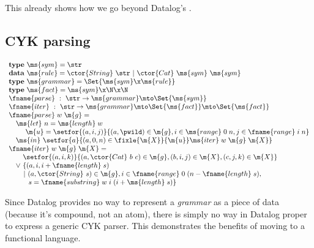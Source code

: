 \documentclass[preprint]{sigplanconf}
\newcommand{\uto}{\to}
\begin{document}
\TODO This already shows how we go beyond Datalog's .

\subsection{CYK parsing}

\[\begin{array}{l}
\mathbf{type}~\ms{sym} = \str\\
\mathbf{data}~\ms{rule} = \ctor{String}~\str ~|~ \ctor{Cat}~\ms{sym}~\ms{sym}\\
\mathbf{type}~\ms{grammar} = \Set{\ms{sym} \x \ms{rule}}\\
\mathbf{type}~\ms{fact} = \ms{sym} \x \N \x \N\\
\fname{parse} ~:~ \str \uto \ms{grammar} \mto \Set{\ms{sym}}\\
\fname{iter} ~:~ \str \uto \ms{grammar} \mto \Set{\ms{fact}}
\mto \Set{\ms{fact}}\\
\fname{parse}\;w\;\m{g} =\\
\hspace{1em} \ms{let}~ n = \ms{length}\;w\\
\hspace{2.375em}\m{u} =
  \setfor{(a,i,j)}{(a,\pwild) \in \m{g}, i \in \ms{range}\;0\;n,
  j\in\fname{range}\;i\;n}\\
\hspace{1em}\ms{in}~\setfor{a}{(a, 0, n) \in %
  \fixle{\m{X}}{\m{u}} \ms{iter}\;w\;\m{g}\;\m{X}}\\
\fname{iter}\;w\;\m{g}\;\m{X} =\\
\hspace{1em}\phantom{\vee~}\setfor{(a,i,k)}{(a, \ctor{Cat}~b~c) \in \m{g},
  (b,i,j) \in \m{X}, (c,j,k) \in \m{X}}\\
\hspace{1em}\vee~ \{(a,i,i+\fname{length}\;s)\\
\hspace{2.1em}|~ (a, \ctor{String}~s) \in \m{g},
i \in \fname{range}\;0\;(n-\fname{length}\;s),\\
\hspace{2.2em}\phantom{|~} s = \fname{substring}\;w\;i\;(i+\ms{length}\;s)\}
\end{array}\]

\TODO Since Datalog provides no way to represent a \emph{grammar} as a piece of
data (because it's compound, not an atom), there is simply no way in Datalog
proper to express a generic CYK parser. This demonstrates the benefits of moving
to a functional language.
\end{document}
